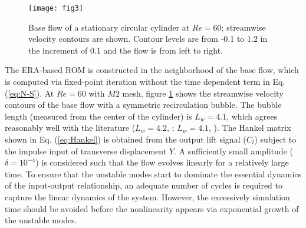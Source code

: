 \documentclass{jfm}
\begin{document}
\begin{figure}
	 \centering
	 \texttt{[image: fig3]}
     \caption{Base flow of a stationary circular cylinder at $Re=60$; 
     streamwise velocity contours are shown.
     Contour levels are from -0.1 to 1.2 in the increment of 0.1 and the flow is from left to right.}
\label{fig:base}
\end{figure}

The ERA-based ROM is constructed in the neighborhood of the base flow, 
which is computed via fixed-point iteration 
without the time dependent term in  Eq. (\ref{eq:N-S}).
At $Re=60$ with $M2$ mesh, figure \ref{fig:base} shows the streamwise velocity 
contours of the base flow  with a symmetric recirculation bubble.
The bubble length (measured from the center of the cylinder) 
is $L_w = 4.1$, which agrees reasonably well with the literature 
($L_w = 4.2$, \cite{Luchini2007}; $L_w = 4.1$, \cite{Mao2014}).  
The Hankel matrix shown in Eq. (\ref{eq:Hankel}) is obtained 
from the output lift signal ($C_l$) subject to the impulse input of transverse displacement $Y$.
A sufficiently small amplitude ($\delta=10^{-4}$) is considered
such that the flow evolves linearly for a relatively large time.
To ensure that the unstable modes start to dominate the essential dynamics 
of the input-output relationship, an adequate number of cycles is required 
to capture the linear dynamics of the system. However, 
the excessively simulation time should be avoided before 
the nonlinearity appears via exponential growth of the unstable modes. 
\end{document}
